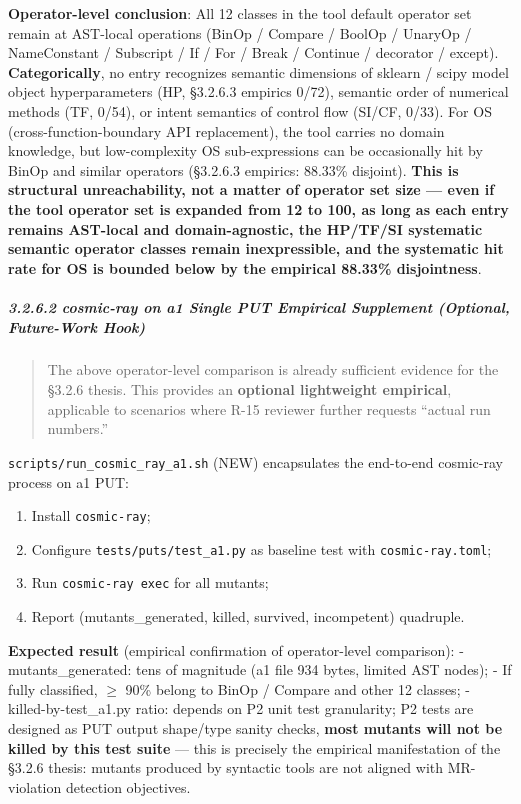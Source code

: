 \documentclass[review,12pt,authoryear]{elsarticle}
\providecommand{\tightlist}{\setlength{\itemsep}{0pt}\setlength{\parskip}{0pt}}
\begin{document}
\textbf{Operator-level conclusion}: All 12 classes in the tool default
operator set remain at AST-local operations (BinOp / Compare / BoolOp /
UnaryOp / NameConstant / Subscript / If / For / Break / Continue /
decorator / except). \textbf{Categorically}, no entry recognizes
semantic dimensions of sklearn / scipy model object hyperparameters (HP,
§3.2.6.3 empirics 0/72), semantic order of numerical methods (TF, 0/54),
or intent semantics of control flow (SI/CF, 0/33). For OS
(cross-function-boundary API replacement), the tool carries no domain
knowledge, but low-complexity OS sub-expressions can be occasionally hit
by BinOp and similar operators (§3.2.6.3 empirics: 88.33\% disjoint).
\textbf{This is structural unreachability, not a matter of operator set
size --- even if the tool operator set is expanded from 12 to 100, as
long as each entry remains AST-local and domain-agnostic, the HP/TF/SI
systematic semantic operator classes remain inexpressible, and the
systematic hit rate for OS is bounded below by the empirical 88.33\%
disjointness}.

\subparagraph{3.2.6.2 cosmic-ray on a1 Single PUT Empirical Supplement
(Optional, Future-Work
Hook)}\label{cosmic-ray-on-a1-single-put-empirical-supplement-optional-future-work-hook}

\begin{quote}
The above operator-level comparison is already sufficient evidence for
the §3.2.6 thesis. This provides an \textbf{optional lightweight
empirical}, applicable to scenarios where R-15 reviewer further requests
``actual run numbers.''
\end{quote}

\texttt{scripts/run\_cosmic\_ray\_a1.sh} (NEW) encapsulates the
end-to-end cosmic-ray process on a1 PUT:

\begin{enumerate}
\def\labelenumi{\arabic{enumi}.}
\tightlist
\item
  Install \texttt{cosmic-ray};
\item
  Configure \texttt{tests/puts/test\_a1.py} as baseline test with
  \texttt{cosmic-ray.toml};
\item
  Run \texttt{cosmic-ray\ exec} for all mutants;
\item
  Report (mutants\_generated, killed, survived, incompetent) quadruple.
\end{enumerate}

\textbf{Expected result} (empirical confirmation of operator-level
comparison): - mutants\_generated: tens of magnitude (a1 file 934 bytes,
limited AST nodes); - If fully classified, $\geq$ 90\% belong to BinOp /
Compare and other 12 classes; - killed-by-test\_a1.py ratio: depends on
P2 unit test granularity; P2 tests are designed as PUT output shape/type
sanity checks, \textbf{most mutants will not be killed by this test
suite} --- this is precisely the empirical manifestation of the §3.2.6
thesis: mutants produced by syntactic tools are not aligned with
MR-violation detection objectives.
\end{document}
